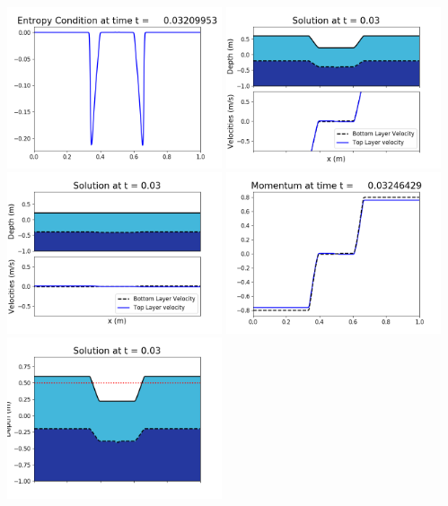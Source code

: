 \documentclass[11pt]{article}
\begin{document}
\vskip 10pt 
\includegraphics[width=0.475\textwidth]{frame0089fig1009.png}
\vskip 10pt 
\includegraphics[width=0.475\textwidth]{frame0090fig1001.png}
\includegraphics[width=0.475\textwidth]{frame0090fig1002.png}
\vskip 10pt 
\includegraphics[width=0.475\textwidth]{frame0090fig1003.png}
\includegraphics[width=0.475\textwidth]{frame0090fig1006.png}
\end{document}
